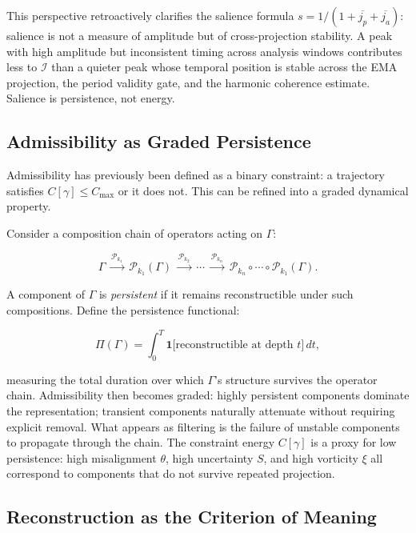 \documentclass[12pt, a4paper]{article}
\begin{document}
This perspective retroactively clarifies the salience formula $s = 1/(1 + \overline{j_p} + \overline{j_a})$: salience is not a measure of amplitude but of cross-projection stability. A peak with high amplitude but inconsistent timing across analysis windows contributes less to $\mathcal{I}$ than a quieter peak whose temporal position is stable across the EMA projection, the period validity gate, and the harmonic coherence estimate. Salience is persistence, not energy.

\subsection{Admissibility as Graded Persistence}

Admissibility has previously been defined as a binary constraint: a trajectory satisfies $C[\gamma] \leq C_{\max}$ or it does not. This can be refined into a graded dynamical property.

Consider a composition chain of operators acting on $\Gamma$:

\begin{equation}
\Gamma
\;\xrightarrow{\mathcal{P}_{k_1}}\;
\mathcal{P}_{k_1}(\Gamma)
\;\xrightarrow{\mathcal{P}_{k_2}}\;
\cdots
\;\xrightarrow{\mathcal{P}_{k_n}}\;
\mathcal{P}_{k_n} \circ \cdots \circ \mathcal{P}_{k_1}(\Gamma).
\label{eq:chain}
\end{equation}

A component of $\Gamma$ is \emph{persistent} if it remains reconstructible under such compositions. Define the persistence functional:

\begin{equation}
\Pi(\Gamma) = \int_0^T \mathbf{1}\bigl[\text{reconstructible at depth } t\bigr]\, dt,
\label{eq:Pifunc}
\end{equation}

measuring the total duration over which $\Gamma$'s structure survives the operator chain. Admissibility then becomes graded: highly persistent components dominate the representation; transient components naturally attenuate without requiring explicit removal. What appears as filtering is the failure of unstable components to propagate through the chain. The constraint energy $C[\gamma]$ is a proxy for low persistence: high misalignment $\theta$, high uncertainty $S$, and high vorticity $\xi$ all correspond to components that do not survive repeated projection.

\subsection{Reconstruction as the Criterion of Meaning}
\end{document}
